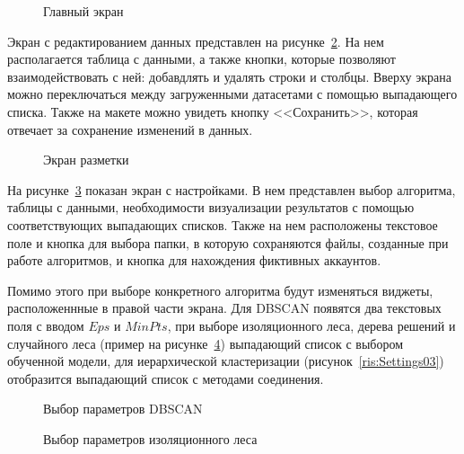 \begin{figure}[H]
    \caption{Главный экран}
    \label{ris:Main}
\end{figure}

Экран с редактированием данных представлен на рисунке~\ref{ris:Razmetka}. На нем располагается таблица с данными, а также кнопки, которые позволяют взаимодействовать с ней: добавдлять и удалять строки и столбцы. Вверху экрана можно переключаться между загруженными датасетами с помощью выпадающего списка. Также на макете можно увидеть кнопку <<Сохранить>>, которая отвечает за сохранение изменений в данных.

\begin{figure}[h!]
    \caption{Экран разметки}
    \label{ris:Razmetka}
\end{figure}

На рисунке~\ref{ris:Settings01} показан экран с настройками. В нем представлен выбор алгоритма, таблицы с данными, необходимости визуализации результатов с помощью соответствующих выпадающих списков. Также на нем расположены текстовое поле и кнопка для выбора папки, в которую сохраняются файлы, созданные при работе алгоритмов, и кнопка для нахождения фиктивных аккаунтов. 

Помимо этого при выборе конкретного алгоритма будут изменяться виджеты, расположеннные в правой части экрана. Для DBSCAN появятся два текстовых поля с вводом $Eps$ и $MinPts$, при выборе изоляционного леса, дерева решений и случайного леса (пример на рисунке~\ref{ris:Settings02}) выпадающий список с выбором обученной модели, для иерархической кластеризации (рисунок~\ref{ris:Settings03}) отобразится выпадающий список с методами соединения.

\begin{figure}[H]
    \caption{Выбор параметров DBSCAN}
    \label{ris:Settings01}
\end{figure}


\begin{figure}[H]
    \caption{Выбор параметров изоляционного леса}
    \label{ris:Settings02}
\end{figure}

